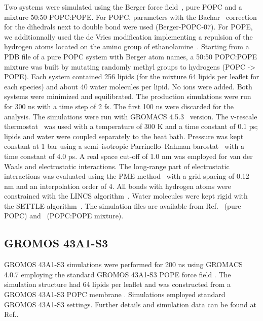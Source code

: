 \documentclass[journal=jpcbfk]{achemso}
\begin{document}
Two systems were simulated using the Berger force field~\cite{Berger97}, pure POPC and a mixture 50:50 POPC:POPE. For POPC, parameters with the Bachar~\cite{bachar04} correction for the dihedrals next to double bond were used (Berger-POPC-07). For POPE, we additionnally used the de Vries modification implementing a repulsion of the hydrogen atoms located on the amino group of ethanolamine~\cite{devries04}.
Starting from a PDB file of a pure POPC system with Berger atom names, a 50:50 POPC:POPE mixture was built by mutating randomly methyl groups to hydrogens (POPC -> POPE). Each system contained 256 lipids (for the mixture 64 lipids per leaflet for each species) and about 40 water molecules per lipid. No ions were added. Both systems were minimized and equilibrated. The production simulations were run for 300 ns with a time step of 2 fs. The first 100 ns were discarded for the analysis. The simulations were run with GROMACS 4.5.3~\cite{pronk13} version. The v-rescale thermostat~\cite{bussi07} was used with a temperature of 300 K and a time constant of 0.1 ps; lipids and water were coupled separately to the heat bath. Pressure was kept constant at 1 bar using a semi–isotropic Parrinello–Rahman barostat~\cite{parrinello81} with a time constant of 4.0 ps. A real space cut-off of 1.0 nm was employed for van der Waals and electrostatic interactions. The long-range part of electrostatic interactions was evaluated using the PME method~\cite{darden93,essman95} with a grid spacing of 0.12 nm and an interpolation order of 4. All bonds with hydrogen atoms were constrained with the LINCS algorithm~\cite{hess07,hess97}. Water molecules were kept rigid with the SETTLE algorithm~\cite{miyamoto92}. The simulation files are available from
Ref.~ (pure POPC) and~ (POPC:POPE mixture).


\subsection{GROMOS 43A1-S3}

 GROMOS 43A1-S3 simulations were performed for 200 ns using GROMACS 4.0.7 employing the standard GROMOS 43A1-S3 POPE force field \cite{chiu09}. The simulation structure had 64 lipids per leaflet and was constructed from a GROMOS 43A1-S3 POPC membrane \cite{piggot12}. Simulations employed standard GROMOS 43A1-S3 settings. Further details and simulation data can be found at Ref..
\end{document}
